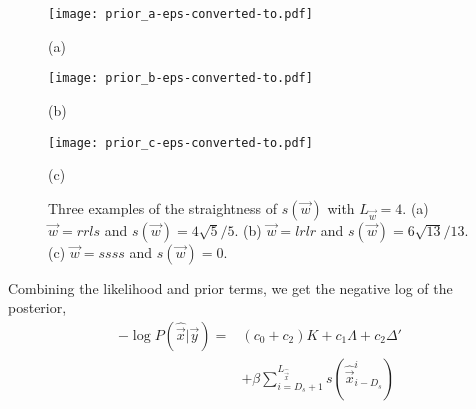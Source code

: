 \begin{figure}[h]

\begin{minipage}[b]{.32\linewidth}
  \centering
  \centerline{\texttt{[image: prior\_a-eps-converted-to.pdf]}}
  \centerline{(a)}\medskip
\end{minipage}
\hfill
\begin{minipage}[b]{0.32\linewidth}
  \centering
  \centerline{\texttt{[image: prior\_b-eps-converted-to.pdf]}}
  \centerline{(b)}\medskip
\end{minipage}
\hfill
\begin{minipage}[b]{0.32\linewidth}
  \centering
  \centerline{\texttt{[image: prior\_c-eps-converted-to.pdf]}}
  \centerline{(c)}\medskip
\end{minipage}

\vspace{-0.3cm}
\caption{Three examples of the straightness of $s(\vec{w})$ with $L_{\vec{w}}=4$. (a) $\vec{w}=rrls$ and $s(\vec{w})=4\sqrt{5}/5$. (b) $\vec{w}=lrlr$ and $s(\vec{w})=6\sqrt{13}/13$. (c) $\vec{w}=ssss$ and $s(\vec{w})=0$.}
\label{fig:prior}
\end{figure}

Combining the likelihood and prior terms, we get the negative log of the posterior,
\begin{equation}
\label{eq:posterior}
\begin{split}
 -\log P(\hat{\vec{x}}|\vec{y})= & (c_0 + c_2) K + c_1 \Lambda + c_2 \Delta' \\
& +\beta \sum\limits_{i=D_s+1}^{L_{\hat{\vec{x}}}} s(\hat{\vec{x}}_{i-D_s}^i)
\end{split}
\end{equation}
